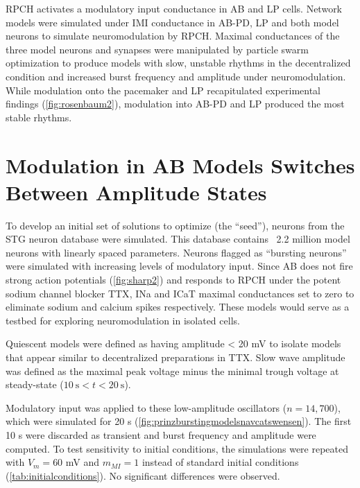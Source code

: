 \acs{RPCH} activates a modulatory input conductance in \acs{AB} and \acs{LP} cells. Network models were simulated under \acs{IMI} conductance in \acs{AB}-\acs{PD}, \acs{LP} and both model neurons to simulate neuromodulation by \acs{RPCH}. Maximal conductances of the three model neurons and synapses were manipulated by particle swarm optimization to produce models with slow, unstable rhythms in the decentralized condition and increased burst frequency and amplitude under neuromodulation. While modulation onto the pacemaker and \acs{LP} recapitulated experimental findings (\autoref{fig:rosenbaum2}), modulation into \acs{AB}-\acs{PD} and \acs{LP} produced the most stable rhythms. 

\section{Modulation in AB Models Switches Between Amplitude States}
To develop an initial set of solutions to optimize (the ``seed''), neurons from the \acs{STG} neuron database were simulated\autocite{PrinzAlternativehandtuningconductancebased2003}. This database contains ~2.2 million model neurons with linearly spaced parameters. Neurons flagged as ``bursting neurons'' were simulated with increasing levels of modulatory input. Since \acs{AB} does not fire strong action potentials (\autoref{fig:sharp2}) and responds to \acs{RPCH} under the potent sodium channel blocker \acs{TTX}, \ac{INa} and \acs{ICaT} maximal conductances set to zero to eliminate sodium and calcium spikes respectively\autocite{NusbaumNeuronalRoleCrustacean1988}. These models would serve as a testbed for exploring neuromodulation in isolated cells.

Quiescent models were defined as having amplitude < 20 mV to isolate models that appear similar to decentralized preparations in \ac{TTX}\autocite{NusbaumNeuronalRoleCrustacean1988}. Slow wave amplitude was defined as the maximal peak voltage minus the minimal trough voltage at steady-state ($10~\mathrm{s} < t < 20~\mathrm{s}$).

Modulatory input was applied to these low-amplitude oscillators ($n = 14,700$), which were simulated for 20 s (\autoref{fig:prinzburstingmodelsnavcatswensen}). The first 10 s were discarded as transient and burst frequency and amplitude were computed. To test sensitivity to initial conditions, the simulations were repeated with $V_m = 60$ mV and $m_{MI} = 1$ instead of standard initial conditions (\autoref{tab:initialconditions}). No significant differences were observed.

